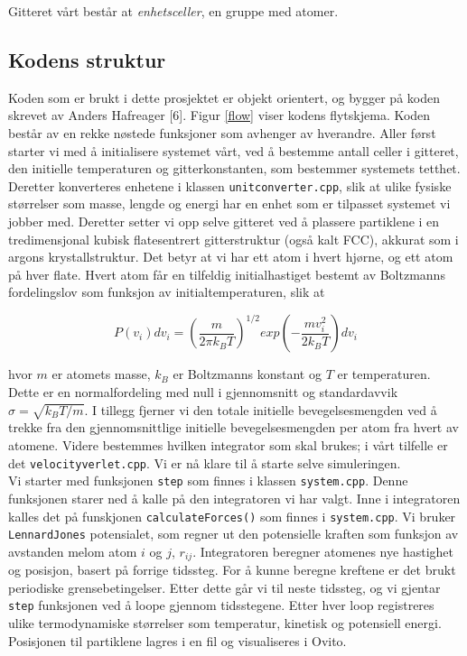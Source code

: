 \documentclass[paper=a4, fontsize=11pt]{scrartcl} %
\numberwithin{equation}{section} %
\numberwithin{figure}{section} %
\numberwithin{table}{section} %
\begin{document}
Gitteret vårt består at \textit{enhetsceller}, en gruppe med atomer. 


\subsection{Kodens struktur}
Koden som er brukt i dette prosjektet er objekt orientert, og bygger på koden skrevet av Anders Hafreager [6]. Figur \ref{flow} viser kodens flytskjema. Koden består av en rekke nøstede funksjoner som avhenger av hverandre. Aller først starter vi med å initialisere systemet vårt, ved å bestemme antall celler i gitteret, den initielle temperaturen og gitterkonstanten, som bestemmer systemets tetthet. Deretter konverteres enhetene i klassen \texttt{unitconverter.cpp}, slik at ulike fysiske størrelser som masse, lengde og energi har en enhet som er tilpasset systemet vi jobber med. Deretter setter vi opp selve gitteret ved å plassere partiklene i en tredimensjonal kubisk flatesentrert gitterstruktur (også kalt FCC), akkurat som i argons krystallstruktur. Det betyr at vi har ett atom i hvert hjørne, og ett atom på hver flate. Hvert atom får en tilfeldig initialhastiget bestemt av Boltzmanns fordelingslov som funksjon av initialtemperaturen, slik at 

\begin{equation}
P(v_i)dv_i = \left(\frac{m}{2\pi k_B T} \right)^{1/2} exp \left(- \frac{mv_i^2}{2k_B T} \right)dv_i
\end{equation}

hvor $m$ er atomets masse, $k_B$ er Boltzmanns konstant og $T$ er temperaturen. Dette er en normalfordeling med null i gjennomsnitt og standardavvik $\sigma = \sqrt{k_B T/m}$. I tillegg fjerner vi den totale initielle bevegelsesmengden ved å trekke fra den gjennomsnittlige initielle bevegelsesmengden per atom fra hvert av atomene. Videre bestemmes hvilken integrator som skal brukes; i vårt tilfelle er det \texttt{velocityverlet.cpp}. Vi er nå klare til å starte selve simuleringen. \\

Vi starter med funksjonen \texttt{step} som finnes i klassen \texttt{system.cpp}. Denne funksjonen starer ned å kalle på den integratoren vi har valgt. Inne i integratoren kalles det på funskjonen \texttt{calculateForces()} som finnes i \texttt{system.cpp}. Vi bruker \texttt{LennardJones} potensialet, som regner ut den potensielle kraften som funksjon av avstanden melom atom $i$ og $j$, $r_{ij}$. Integratoren beregner atomenes nye hastighet og posisjon, basert på forrige tidssteg. For å kunne beregne kreftene er det brukt periodiske grensebetingelser. Etter dette går vi til neste tidssteg, og vi gjentar \texttt{step} funksjonen ved å loope gjennom tidsstegene. Etter hver loop registreres ulike termodynamiske størrelser som temperatur, kinetisk og potensiell energi. Posisjonen til partiklene lagres i en fil og visualiseres i Ovito. 
\end{document}
